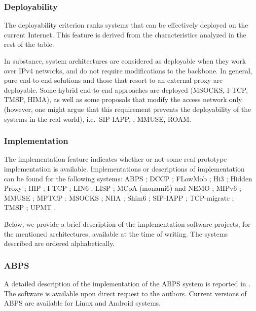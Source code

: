 \documentclass[preprint,12pt]{elsarticle}
\begin{document}
\subsubsection{Deployability}
The deployability criterion ranks systems that can be effectively deployed on the 
current Internet. This feature is derived from the characteristics analyzed in 
the rest of the table.

In substance, system architectures are considered as deployable when they work over 
IPv4 networks, and do not require modifications to the backbone. In general, 
pure end-to-end solutions and those that resort to an external 
proxy are deployable. 
Some hybrid end-to-end approaches are deployed (MSOCKS, I-TCP, TMSP, HIMA), as 
well as some proposals that modify the access 
network only (however, one might argue that this requirement prevents the 
deployability of the systems in the real world), i.e.~SIP-IAPP, \cite{WuYH07}, 
MMUSE, ROAM.

\subsubsection{Implementation} 
The implementation feature indicates whether or not some real prototype 
implementation is available. Implementations or descriptions of implementation can 
be found for the following systems: 
ABPS \cite{GhiniJSS};
DCCP \cite{dccp_imp};
FLowMob \cite{MeliaBOGC11};
Hi3 \cite{hi3};
Hidden Proxy \cite{ghi06};
HIP \cite{LundbergJanne-ols2003,openhip_tech};
I-TCP \cite{itcp};
LIN6 \cite{draft-teraoka-ipng,kunishi2000lin6};
LISP \cite{openlisp,lispmob};
MCoA (monami6) and NEMO \cite{nemo1,umip,tahi};
MIPv6 \cite{Li:2009,nemo1,umip,tahi};
MMUSE \cite{mmuse_code};
MPTCP \cite{mptcp,Paasch:2012};
MSOCKS \cite{msocks};
NIIA \cite{Schutz20101142};
Shim6 \cite{Barre:2011,openhip_tech};
SIP-IAPP \cite{802f02};
TCP-migrate \cite{tcp-migrate};
TMSP \cite{LimYLL09};
UPMT \cite{Bonola:2009,upmtRoma}.

Below, we provide a brief description of the implementation software 
projects, for the mentioned architectures, available at the time of writing.
The systems described are ordered alphabetically.

\subsubsection*{ABPS} 
A detailed description of the implementation of the ABPS system is 
reported in \cite{GhiniJSS}. The software is available upon direct request to 
the authors. Current versions of ABPS are available for Linux and Android 
systems.
\end{document}
